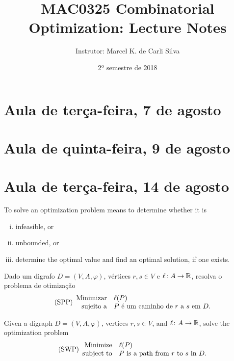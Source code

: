 \documentclass[10pt,reqno]{amsart}
\title{MAC0325 Combinatorial Optimization: Lecture Notes}
\author{Instrutor: Marcel {K.} de Carli Silva}
\date{2º semestre de 2018}
\begin{document}
\begin{abstract}

\end{abstract}

\maketitle

\tableofcontents

\section{Aula de terça-feira, 7 de agosto}

\section{Aula de quinta-feira, 9 de agosto}

\section{Aula de terça-feira, 14 de agosto}

To solve an optimization problem means to determine whether it is
\begin{enumerate}[(i)]
\item infeasible, or
\item unbounded, or
\item determine the optimal value and find an optimal solution, if one
  exists.
\end{enumerate}

\begin{problem*}
  Dado um digrafo \(D = (V,A,\varphi)\), vértices \(r,s \in V\) e
  \(\ell \colon A \to \mathbb{R}\), resolva o problema de otimização
  \begin{equation}
    \label{eq:1}
    \tag{SPP}
    \begin{array}{{rl}}
      \text{Minimizar} & \ell(P) \\
      \text{sujeito a} & \text{\(P\) é um caminho de \(r\) a \(s\) em~\(D\)}.
    \end{array}
  \end{equation}
\end{problem*}

\begin{problem*}
  Given a digraph \(D = (V,A,\varphi)\), vertices \(r,s \in V\), and
  \(\ell \colon A \to \mathbb{R}\), solve the optimization problem
  \begin{equation}
    \label{eq:2}
    \tag{SWP}
    \begin{array}{{rl}}
      \text{Minimize}   & \ell(P) \\
      \text{subject to} & \text{\(P\) is a path from \(r\) to \(s\) in~\(D\)}.
    \end{array}
  \end{equation}
\end{problem*}
\end{document}
